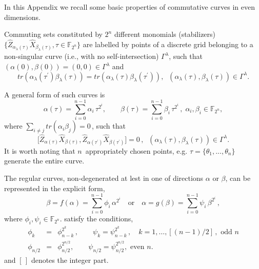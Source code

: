 \documentclass{article}
\begin{document}
In this Appendix we recall some basic properties of commutative curves in
even dimensions.

Commuting sets constituted by $2^{n}$ different monomials (stabilizers) $\{%
\hat{Z}_{\alpha _{\lambda }(\tau )}\hat{X}_{\beta _{\lambda }(\tau )},\tau
\in \mathbb{F}_{2^{n}}\}$ are labelled by points of a discrete grid
belonging to a non-singular curve  (i.e., with no self-intersection) $\Gamma
^{\lambda }$, such that $(\alpha (0),\beta (0))=(0,0)\in \Gamma ^{\lambda }$
and%
\[
tr\left( \alpha _{\lambda }(\tau ^{\prime })\beta _{\lambda }(\tau )\right)
=tr\left( \alpha _{\lambda }(\tau )\beta _{\lambda }(\tau ^{\prime })\right)
,\;\;\left( \alpha _{\lambda }(\tau ),\beta _{\lambda }(\tau )\right) \in
\Gamma ^{\lambda }.
\]

A general form of such curves is 
\begin{equation}
\alpha (\tau )=\sum_{i=0}^{n-1}\alpha _{i}\,\tau ^{2^{i}},\qquad \beta (\tau
)=\sum_{i=0}^{n-1}\beta _{i}\,\tau ^{2^{i}}\,,\;\alpha _{i},\beta _{i}\in 
\mathbb{F}_{2^{n}},  \label{curve1}
\end{equation}%
where $\sum_{i\neq j}tr(\alpha _{i}\beta _{j})=0\,$, such that  
\begin{equation}
\lbrack \hat{Z}_{\alpha (\tau )}\hat{X}_{\beta (\tau )},\hat{Z}_{\alpha
(\tau ^{\prime })}\hat{X}_{\beta (\tau ^{\prime })}]=0\,,\;\;\left( \alpha
_{\lambda }(\tau ),\beta _{\lambda }(\tau )\right) \in \Gamma ^{\lambda }.
\label{stab}
\end{equation}%
It is worth noting that $n$\ appropriately chosen points, e.g. $\tau
=\{\theta _{1},...,\theta _{n}\}$ generate the entire curve. 

The regular curves, non-degenerated at lest in one of directions  $\alpha $
or $\beta $, can be represented in the explicit form, 
\begin{equation}
\beta =f(\alpha )=\sum_{i=0}^{n-1}\phi _{i}\,\alpha ^{2^{i}}\quad \mathrm{or}%
\quad \alpha =g(\beta )=\sum_{i=0}^{n-1}\psi _{i}\,\beta ^{2^{i}}\,,
\label{RC}
\end{equation}%
where $\phi _{i},\psi _{i}\in \mathbb{F}_{2^{n}}.$ satisfy the conditions,  
\begin{eqnarray}
\phi _{k} &=&\phi _{n-k}^{2^{k}}\,,\qquad \psi _{k}=\psi
_{n-k}^{2^{k}}\,,\quad k=1,\ldots ,[(n-1)/2]\,,\text{ odd }n  \label{Acc} \\
\phi _{n/2} &=&\phi _{n/2}^{2^{n/2}},\qquad \psi _{n/2}=\psi
_{n/2}^{2^{n/2}},\text{ even }n\text{.}
\end{eqnarray}%
and $[\,]$ denotes the integer part. 
\end{document}
